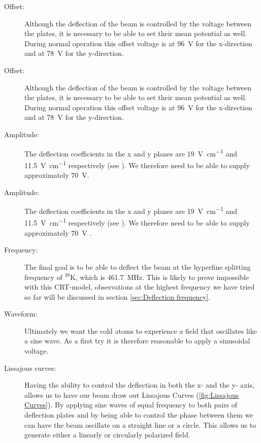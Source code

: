 \begin{description}
	\item[Offset:] Although the deflection of the beam is controlled by the voltage between the plates, it is necessary to be able to set their mean potential as well. During normal operation this offset voltage is at \SI{96}{\volt} for the x-direction and at \SI{78}{\volt} for the y-direction.
	\item[Offset:] Although the deflection of the beam is controlled by the voltage between the plates, it is necessary to be able to set their mean potential as well. During normal operation this offset voltage is at \SI{96}{\volt} for the x-direction and at \SI{78}{\volt} for the y-direction. 
	
	\item[Amplitude:] The deflection coefficients in the x and y planes are \SI{19}{\volt\per\centi\meter} and \SI{11.5}{\volt\per\centi\meter} respectively (see \cite{D14363GY123-manual}). We therefore need to be able to supply approximately \SI{70}{\volt}.
	\item[Amplitude:] The deflection coefficients in the x and y planes are \SI{19}{\volt\per\centi\meter} and \SI{11.5}{\volt\per\centi\meter} respectively (see \cite{D14363GY123-manual}). We therefore need to be able to supply approximately \SI{70}{\volt} .
	
	\item[Frequency:] The final goal is to be able to deflect the beam at the hyperfine splitting frequency of $^{39}\mathrm{K}$, which is \SI{461.7}{\mega\hertz}. This is likely to prove impossible with this CRT-model, observations at the highest frequency we have tried so far will be discussed in section \cref{sec:Deflection frequency}.
	
	\item[Waveform:] Ultimately we want the cold atoms to experience a field that oscillates like a sine wave. As a first try it is therefore reasonable to apply a sinusoidal voltage.
	
	\item[Lissajous curves:] Having the ability to control the deflection in both the x- and the y- axis, allows us to have our beam draw out Lissajous Curves (\cref{fig:Lissajous Curves}). By applying sine waves of equal frequency to both pairs of deflection plates and by being able to control the phase between them we can have the beam oscillate on a straight line or a circle. This allows us to generate either a linearly or circularly polarized field.
\end{description}

